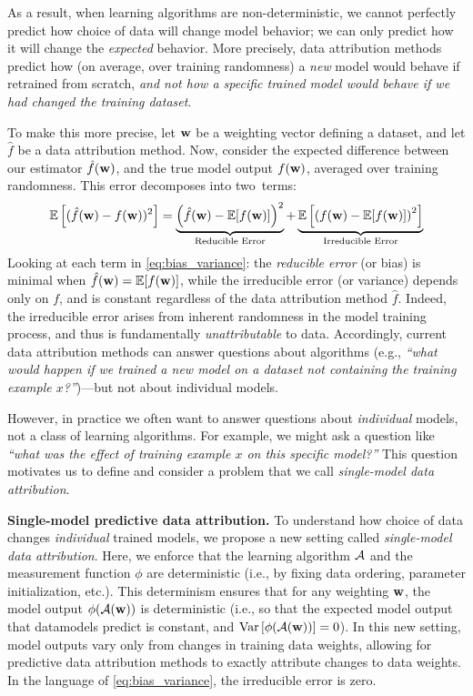 As a result, when learning algorithms are non-deterministic, we cannot perfectly
predict how choice of data will change model behavior; we can only predict how
it will change the {\em expected} behavior. More precisely, data attribution
methods predict how (on average, over training randomness) a {\em new} model
would behave if retrained from scratch, {\em and not how a specific trained
model would behave if we had changed the training dataset}.

To make this more precise, let $\mathbf{w}$ be a weighting vector defining a 
dataset, and let $\hat{f}$ be a data attribution method.
Now, consider the expected difference between our estimator $\hat{f}(\mathbf{w})$,
and the true model output $f(\mathbf{w})$, averaged over training randomness. 
This error decomposes into two~terms:
\begin{equation}
  \label{eq:bias_variance}
  \mathbb{E}\left[(\hat{f}(\mathbf{w}) - f(\mathbf{w}))^2\right] =
  \underbrace{\left(\hat{f}(\mathbf{w}) -
  \mathbb{E}[f(\mathbf{w})]\right)^2}_{\text{Reducible Error}} +
  \underbrace{\mathbb{E}\left[\left(f(\mathbf{w}) -
  \mathbb{E}[f(\mathbf{w})]\right)^2\right]}_{\text{Irreducible Error}}
\end{equation}
Looking at each term in \eqref{eq:bias_variance}: the \textit{reducible error}
(or bias) is minimal when $\hat{f}(\mathbf{w}) = \mathbb{E}[f(\mathbf{w})]$,
while the irreducible error (or variance) depends only on $f$,
and is constant regardless of the data attribution method $\hat{f}$.
Indeed, the irreducible error
arises from inherent randomness in the model training process, and
thus is fundamentally {\em unattributable} to data. Accordingly, current data
attribution methods can answer questions about algorithms (e.g., {\em ``what
    would happen if we trained a new model on a dataset not containing
    the training
example $x$?''})---but not about individual models.

However, in practice we often want to answer questions about
\textit{individual} models,
not a class of learning algorithms. For example, we might ask a question
like {\em ``what was the effect of training example $x$ on this specific
model?''} 
This question motivates us to define and consider a problem 
that we call {\em single-model data attribution}.




\medskip
\noindent\textbf{Single-model predictive data attribution.}
To understand how choice of data changes \textit{individual} trained models, we
propose a new setting called {\em single-model data attribution}.
Here, we enforce that
the learning algorithm $\mathcal{A}{}$ and the measurement function $\phi$ are
deterministic (i.e., by fixing data ordering,
parameter initialization, etc.).
This determinism ensures that for any weighting $\mathbf{w}$, the model output
$\phi(\mathcal{A}{}(\mathbf{w}))$ is deterministic
(i.e., so that the expected model output that datamodels predict is constant,
and $\text{Var}\left[{\phi(\mathcal{A}{}(\mathbf{w}))}\right] = 0$). In this new setting,
model outputs vary only from changes in training data weights, allowing for
predictive data attribution methods to exactly attribute changes to
data weights. In the language of \eqref{eq:bias_variance}, the irreducible error
is zero.

